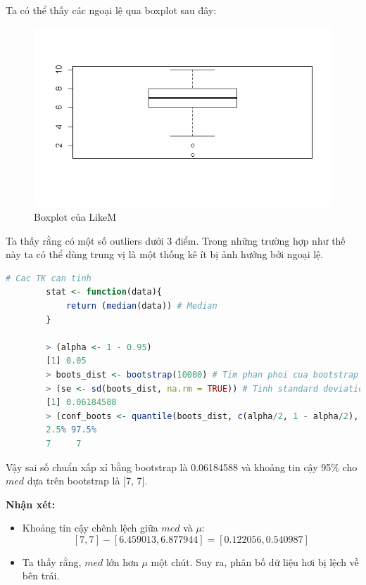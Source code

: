 \documentclass[a4paper,12pt]{article}
\begin{document}
\begin{enumerate}[label = \alph*)]
		Ta có thể thấy các ngoại lệ qua boxplot sau đây:
		\begin{figure}[H]
			\centering
			\includegraphics[width=0.7\linewidth]{Rplot1}
			\caption{Boxplot của LikeM}
			\label{fig:rplot1}
		\end{figure}
		
		Ta thấy rằng có một số outliers dưới 3 điểm. Trong những trường hợp như thế này ta có thể dùng trung vị là một thống kê ít bị ảnh hưởng bởi ngoại lệ.
		
		\begin{lstlisting}[language=R]
		# Cac TK can tinh
		stat <- function(data){
			return (median(data)) # Median
		}
		
		> (alpha <- 1 - 0.95)
		[1] 0.05
		> boots_dist <- bootstrap(10000) # Tim phan phoi cua bootstrap
		> (se <- sd(boots_dist, na.rm = TRUE)) # Tinh standard deviation (missing value se bi bo qua)
		[1] 0.06184588
		> (conf_boots <- quantile(boots_dist, c(alpha/2, 1 - alpha/2), na.rm = TRUE)) # Tim khoang tin cay cho median
		2.5% 97.5% 
		7     7 
		\end{lstlisting}
		Vậy sai số chuẩn xấp xỉ bằng bootstrap là 0.06184588 và khoảng tin cậy 95\% cho $med$ dựa trên bootstrap
		là [7, 7].
	\end{enumerate}
	\textbf{Nhận xét:}
	\begin{itemize}
		\item Khoảng tin cậy chênh lệch giữa $med$ và $\mu$:
			$$[7, 7] - [6.459013, 6.877944] = [0.122056, 0.540987]$$
		\item Ta thấy rằng, $med$ lớn hơn $\mu$ một chút. Suy ra, phân bố dữ liệu hơi bị lệch về bên trái.
	\end{itemize}
\end{document}
